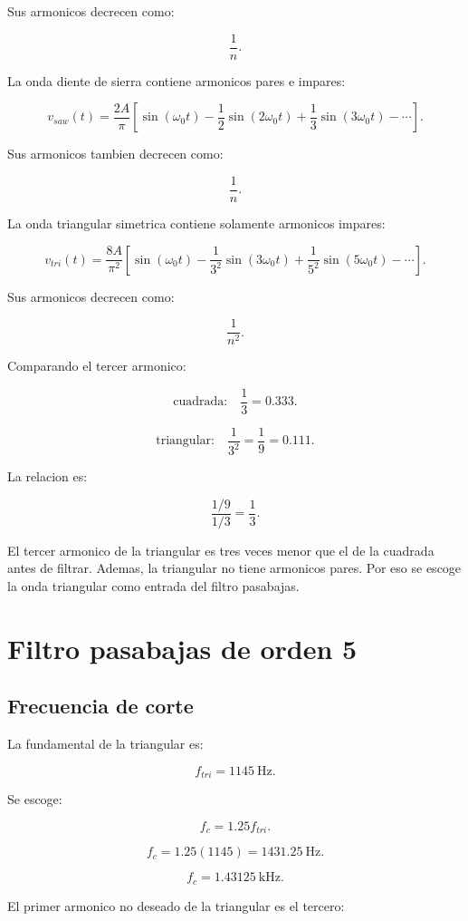 \documentclass[11pt,letterpaper]{article}
\begin{document}
Sus armonicos decrecen como:

\[
\frac{1}{n}.
\]

La onda diente de sierra contiene armonicos pares e impares:

\[
v_{saw}(t)=
\frac{2A}{\pi}
\left[
\sin(\omega_0 t)
-\frac{1}{2}\sin(2\omega_0 t)
+\frac{1}{3}\sin(3\omega_0 t)
-\cdots
\right].
\]

Sus armonicos tambien decrecen como:

\[
\frac{1}{n}.
\]

La onda triangular simetrica contiene solamente armonicos impares:

\[
v_{tri}(t)=
\frac{8A}{\pi^2}
\left[
\sin(\omega_0 t)
-\frac{1}{3^2}\sin(3\omega_0 t)
+\frac{1}{5^2}\sin(5\omega_0 t)
-\cdots
\right].
\]

Sus armonicos decrecen como:

\[
\frac{1}{n^2}.
\]

Comparando el tercer armonico:

\[
\text{cuadrada:}\quad \frac{1}{3}=0.333.
\]

\[
\text{triangular:}\quad \frac{1}{3^2}=\frac{1}{9}=0.111.
\]

La relacion es:

\[
\frac{1/9}{1/3}=\frac{1}{3}.
\]

El tercer armonico de la triangular es tres veces menor que el de la cuadrada
antes de filtrar. Ademas, la triangular no tiene armonicos pares. Por eso se
escoge la onda triangular como entrada del filtro pasabajas.

\section{Filtro pasabajas de orden 5}

\subsection{Frecuencia de corte}

La fundamental de la triangular es:

\[
f_{tri}=1145~\text{Hz}.
\]

Se escoge:

\[
f_c=1.25f_{tri}.
\]

\[
f_c=1.25(1145)=1431.25~\text{Hz}.
\]

\[
\boxed{f_c=1.43125~\text{kHz}}.
\]

El primer armonico no deseado de la triangular es el tercero:
\end{document}
